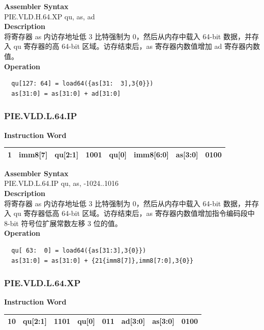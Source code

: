 \textbf{Assembler Syntax} \\
PIE.VLD.H.64.XP qu, as, ad \\
\textbf{Description} \\
将寄存器 as 内访存地址低 3 比特强制为 0，然后从内存中载入 64-bit 数据，并存入 qu 寄存器的高 64-bit 区域。访存结束后，as 寄存器内数值增加 ad 寄存器内数值。\\
\textbf{Operation}
\begin{lstlisting}
  qu[127: 64] = load64({as[31:  3],3{0}})
  as[31:0] = as[31:0] + ad[31:0]
\end{lstlisting}

\newpage
\subsubsection{PIE.VLD.L.64.IP}\label{instruction:PIEVLDL64IP}
\setlength\tabcolsep{6pt}
\textbf{Instruction Word} \\
\begin{tabular}{|c|c|c|c|c|c|c|c|}
	\hline
	1 & imm8[7] & qu[2:1] & 1001 & qu[0] & imm8[6:0] & as[3:0] & 0100 \\
	\hline
\end{tabular}

\textbf{Assembler Syntax} \\
PIE.VLD.L.64.IP qu, as, -1024..1016 \\
\textbf{Description} \\
将寄存器 as 内访存地址低 3 比特强制为 0，然后从内存中载入 64-bit 数据，并存入 qu 寄存器低高 64-bit 区域。访存结束后，as 寄存器内数值增加指令编码段中 8-bit 符号位扩展常数左移 3 位的值。\\
\textbf{Operation}
\begin{lstlisting}
  qu[ 63:  0] = load64({as[31:3],3{0}})
  as[31:0] = as[31:0] + {21{imm8[7]},imm8[7:0],3{0}}
\end{lstlisting}

\newpage
\subsubsection{PIE.VLD.L.64.XP}\label{instruction:PIEVLDL64XP}
\setlength\tabcolsep{6pt}
\textbf{Instruction Word} \\
\begin{tabular}{|c|c|c|c|c|c|c|c|}
	\hline
	10 & qu[2:1] & 1101 & qu[0] & 011 & ad[3:0] & as[3:0] & 0100 \\
	\hline
\end{tabular}

